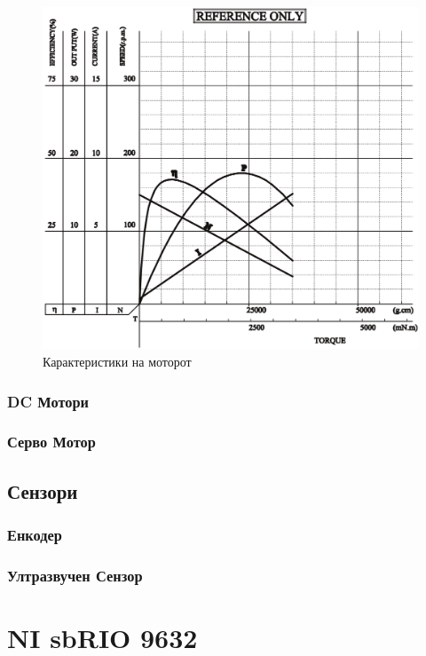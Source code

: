 \documentclass{article}
\begin{document}
\begin{figure}[H]
\includegraphics[width=0.75\linewidth]{motor_graph.png}
\centering
\caption{Карактеристики на моторот}
\label{fig:motor_graph.png}
\end{figure}

\subsubsection{DC Мотори}
\subsubsection{Серво Мотор}
\subsection{Сензори}
\subsubsection{Енкодер}
\subsubsection{Ултразвучен Сензор}
\newpage
\section{NI sbRIO 9632}
\end{document}
